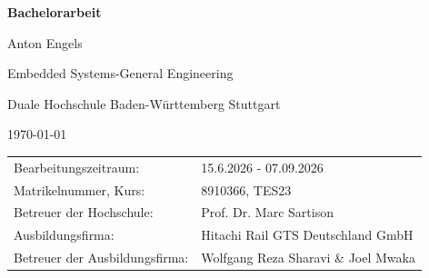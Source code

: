 \begin{titlepage}
    \thispagestyle{fancy}
    \fancyfoot{}
    \centering

    \vspace*{0cm}
    {\Huge\bfseries Bachelorarbeit \\ \Large \projName\par}
    \vspace{1.5cm}
    {\Large Anton Engels\par}
    \vspace{1.0cm}
    {\large Embedded Systems-General Engineering\par}
    \vspace{0.5cm}
    {\large Duale Hochschule Baden-Württemberg Stuttgart\par}
    \vspace{2.0cm}
    {\large \today\par}

    \vfill
    \begin{tabular}{l l}
        Bearbeitungszeitraum: & 15.6.2026 - 07.09.2026 \\
        Matrikelnummer, Kurs: & 8910366, TES23 \\
        \vspace{0.25cm}
        Betreuer der Hochschule: & Prof. Dr. Marc Sartison \\
        Ausbildungsfirma: & Hitachi Rail GTS Deutschland GmbH \\
        Betreuer der Ausbildungsfirma: & Wolfgang Reza Sharavi \& Joel Mwaka \\
       
    \end{tabular}
    \vspace{2cm}

\end{titlepage}

